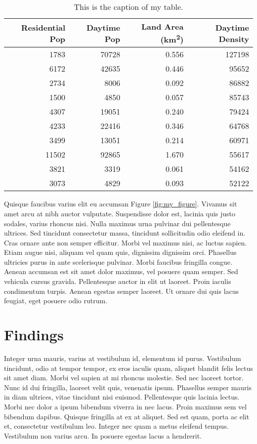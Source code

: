 \documentclass[11pt,letterpaper]{article} %
\begin{document}
\begin{table*}[tbp]
	\centering
	\caption{This is the caption of my table.}
	\label{tab:my_table}
	\begin{tabular}{rrrr}
		\toprule
		Residential Pop &  Daytime Pop &  Land Area (km\textsuperscript{2}) &  Daytime Density \\
		\midrule
		1783  & 70728 & 0.556 & 127198 \\
		6172  & 42635 & 0.446 &  95652 \\
		2734  &  8006 & 0.092 &  86882 \\
		1500  &  4850 & 0.057 &  85743 \\
		4307  & 19051 & 0.240 &  79424 \\
		4233  & 22416 & 0.346 &  64768 \\
		3499  & 13051 & 0.214 &  60971 \\
		11502 & 92865 & 1.670 &  55617 \\
		3821  &  3319 & 0.061 &  54162 \\
		3073  &  4829 & 0.093 &  52122 \\
		\bottomrule
	\end{tabular}
\end{table*}

Quisque faucibus varius elit eu accumsan Figure \ref{fig:my_figure}. Vivamus sit amet arcu at nibh auctor vulputate. Suspendisse dolor est, lacinia quis justo sodales, varius rhoncus nisi. Nulla maximus urna pulvinar dui pellentesque ultrices. Sed tincidunt consectetur massa, tincidunt sollicitudin odio eleifend in. Cras ornare ante non semper efficitur. Morbi vel maximus nisi, ac luctus sapien. Etiam augue nisi, aliquam vel quam quis, dignissim dignissim orci. Phasellus ultricies purus in ante scelerisque pulvinar. Morbi faucibus fringilla congue. Aenean accumsan est sit amet dolor maximus, vel posuere quam semper. Sed vehicula cursus gravida. Pellentesque auctor in elit ut laoreet. Proin iaculis condimentum turpis. Aenean egestas semper laoreet. Ut ornare dui quis lacus feugiat, eget posuere odio rutrum.

\section{Findings}

Integer urna mauris, varius at vestibulum id, elementum id purus. Vestibulum tincidunt, odio at tempor tempor, ex eros iaculis quam, aliquet blandit felis lectus sit amet diam. Morbi vel sapien at mi rhoncus molestie. Sed nec laoreet tortor. Nunc id dui fringilla, laoreet velit quis, venenatis ipsum. Phasellus semper mauris in diam ultrices, vitae tincidunt nisi euismod. Pellentesque quis lacinia lectus. Morbi nec dolor a ipsum bibendum viverra in nec lacus. Proin maximus sem vel bibendum dapibus. Quisque fringilla at ex at aliquet. Sed est quam, porta ac elit et, consectetur vestibulum leo. Integer nec quam a metus eleifend tempus. Vestibulum non varius arcu. In posuere egestas lacus a hendrerit.
\end{document}
